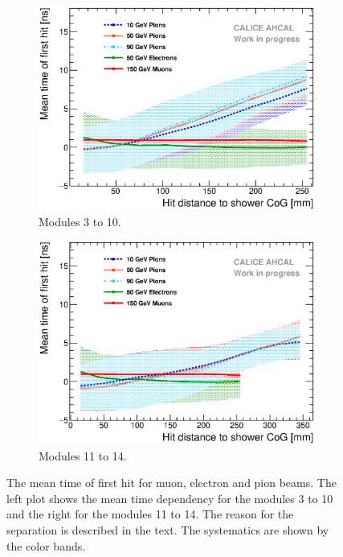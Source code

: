 \begin{figure}[htbp!]
	\begin{subfigure}[t]{0.49\textwidth}
		\centering
		\includegraphics[width=1\textwidth]{../Thesis_Plots/Timing/Pions/Plots/Timing_Radius_Comparison_ShortAsymRange_SSF.eps}
		\caption{Modules 3 to 10.}\label{fig:Radius_Comparison_SSF}
	\end{subfigure}
	\hfill
	\begin{subfigure}[t]{0.49\textwidth}
		\centering
		\includegraphics[width=1\textwidth]{../Thesis_Plots/Timing/Pions/Plots/Timing_Radius_Comparison_ShortAsymRange_BL.eps}
		\caption{Modules 11 to 14.}\label{fig:Radius_Comparison_BL}
	\end{subfigure}
	\caption{The mean time of first hit for muon, electron and pion beams. The left plot shows the mean time dependency for the modules 3 to 10 and the right for the modules 11 to 14. The reason for the separation is described in the text. The systematics are shown by the color bands.}
	\label{fig:RadialTiming}
\end{figure}

